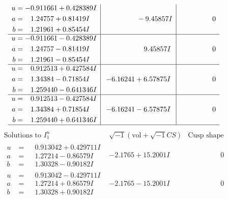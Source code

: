 \documentclass[1p]{elsarticle_modified}
\theoremstyle{definition}
\newcommand{\I}{\sqrt{-1}}
\begin{document}
$$\begin{array}{c|c|c}
\begin{aligned}
u &= -0.911661 + 0.428389 I \\
a &= \phantom{-}1.24757 + 0.81419 I \\
b &= \phantom{-}1.21961 + 0.85454 I\end{aligned}
 & \phantom{-0.000000 } -9.45857 I & \phantom{-0.000000 } 0 \\ \hline\begin{aligned}
u &= -0.911661 - 0.428389 I \\
a &= \phantom{-}1.24757 - 0.81419 I \\
b &= \phantom{-}1.21961 - 0.85454 I\end{aligned}
 & \phantom{-0.000000 -}9.45857 I & \phantom{-0.000000 } 0 \\ \hline\begin{aligned}
u &= \phantom{-}0.912513 + 0.427584 I \\
a &= \phantom{-}1.34384 - 0.71854 I \\
b &= \phantom{-}1.259440 - 0.641346 I\end{aligned}
 & -6.16241 + 6.57875 I & \phantom{-0.000000 } 0 \\ \hline\begin{aligned}
u &= \phantom{-}0.912513 - 0.427584 I \\
a &= \phantom{-}1.34384 + 0.71854 I \\
b &= \phantom{-}1.259440 + 0.641346 I\end{aligned}
 & -6.16241 - 6.57875 I & \phantom{-0.000000 } 0\\
 \hline 
 \end{array}$$\newpage$$\begin{array}{c|c|c}  
\text{Solutions to }I^u_{1}& \I (\text{vol} + \sqrt{-1}CS) & \text{Cusp shape}\\
 \hline 
\begin{aligned}
u &= \phantom{-}0.913042 + 0.429711 I \\
a &= \phantom{-}1.27214 - 0.86579 I \\
b &= \phantom{-}1.30328 - 0.90182 I\end{aligned}
 & -2.1765 + 15.2001 I & \phantom{-0.000000 } 0 \\ \hline\begin{aligned}
u &= \phantom{-}0.913042 - 0.429711 I \\
a &= \phantom{-}1.27214 + 0.86579 I \\
b &= \phantom{-}1.30328 + 0.90182 I\end{aligned}
 & -2.1765 - 15.2001 I & \phantom{-0.000000 } 0 \\ \hline\begin{aligned}

\end{aligned}
\end{array}$$
\end{document}

